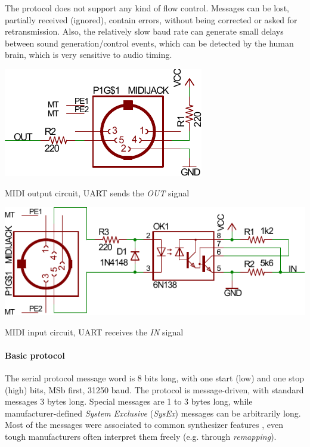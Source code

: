 \documentclass[a4paper,10pt]{article}
\makeatletter
\newenvironment{figurehere}{\def\@captype{figure}\vspace{2ex}}{\vspace{2ex}}
\makeatother
\begin{document}
\begin{multicols}{2}
The protocol does not support any kind of flow control. Messages can be lost,
partially received (ignored), contain errors, without being corrected or asked
for retransmission. Also, the relatively slow baud rate can generate small
delays between sound generation/control events, which can be detected by
the human brain, which is very sensitive to audio timing.

\begin{figurehere}
	\centering
	\includegraphics[keepaspectratio=true,width=0.6\columnwidth]{images/midi_out.pdf}
	\caption{MIDI output circuit, UART sends the \emph{OUT} signal}
	\label{fig:midi_out}
\end{figurehere}

\begin{figurehere}
	\centering
	\includegraphics[keepaspectratio=true,width=\columnwidth]{images/midi_in.pdf}
	\caption{MIDI input circuit, UART receives the \emph{IN} signal}
	\label{fig:midi_in}
\end{figurehere}


\paragraph{Basic protocol}
The serial protocol message word is 8 bits long, with one start (low) and one
stop (high) bits, MSb first, 31250 baud. The protocol is message-driven, with
standard messages 3 bytes long. Special messages are 1 to 3 bytes long, while
manufacturer-defined \emph{System Exclusive} (\emph{SysEx}) messages can be
arbitrarily long. Most of the messages were associated to common synthesizer
features \cite{midi_messages}, even tough manufacturers often interpret them
freely (e.g. through \emph{remapping}).


\end{multicols}
\end{document}
